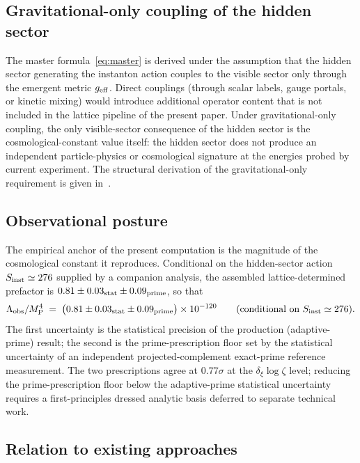 \documentclass[a4paper,11pt]{article}
\theoremstyle{definition}
\newcommand{\MP}{M_{\rm P}}
\newcommand{\Lobs}{\Lambda_{\rm obs}}
\begin{document}
\subsection{Gravitational-only coupling of the hidden sector}
\label{subsec:discussion-coupling}

The master formula~\eqref{eq:master} is derived under the
assumption that the hidden sector generating the instanton action
couples to the visible sector only through the emergent metric
$g_{\rm eff}$. Direct couplings (through scalar labels, gauge
portals, or kinetic mixing) would introduce additional operator
content that is not included in the lattice pipeline of the present
paper. Under gravitational-only coupling, the only visible-sector
consequence of the hidden sector is the cosmological-constant value
itself: the hidden sector does not produce an independent
particle-physics or cosmological signature at the energies probed
by current experiment. The structural derivation of the
gravitational-only requirement is given
in~\cite{companion-structural}.

\subsection{Observational posture}
\label{subsec:discussion-observation}

The empirical anchor of the present computation is the magnitude
of the cosmological constant it reproduces. Conditional on the hidden-sector action $S_{\rm inst} \simeq 276$
supplied by a companion analysis, the assembled
lattice-determined prefactor is
$0.81 \pm 0.03_{\rm stat} \pm 0.09_{\rm prime}$, so that
\[
\Lobs/\MP^4 \;=\; \bigl(0.81 \pm 0.03_{\rm stat} \pm 0.09_{\rm prime}\bigr) \times 10^{-120}
\qquad
\text{(conditional on $S_{\rm inst} \simeq 276$)}.
\]
The first uncertainty is the statistical precision of the production (adaptive-prime) result; the second is the prime-prescription floor set by the statistical uncertainty of an independent projected-complement exact-prime reference measurement. The two prescriptions agree at $0.77\sigma$ at the $\delta_\xi\log\zeta$ level; reducing the prime-prescription floor below the adaptive-prime statistical uncertainty requires a first-principles dressed analytic basis deferred to separate technical work.

\subsection{Relation to existing approaches}
\label{subsec:discussion-comparison}
\end{document}
